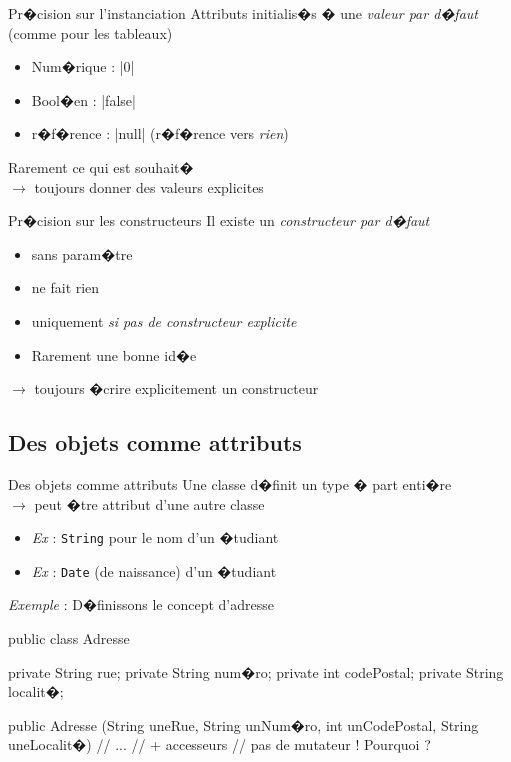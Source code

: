 \begin{frame}{Pr�cision sur l'instanciation}
Attributs initialis�s � une \emph{valeur par d�faut} \\(comme pour les tableaux)
  \begin{itemize}
  \item Num�rique : \java|0|
  \item Bool�en : \java|false|
  \item r�f�rence : \java|null| (r�f�rence vers \emph{rien})
  \end{itemize}
\bigskip
Rarement ce qui est souhait�
  \\$\longrightarrow$ toujours donner des valeurs explicites
\end{frame}

\begin{frame}{Pr�cision sur les constructeurs}
Il existe un \emph{constructeur par d�faut}
\begin{itemize}
  \item sans param�tre 
  \item ne fait rien
  \item uniquement \emph{si pas de constructeur explicite}
  \item Rarement une bonne id�e 
\end{itemize}
$\longrightarrow$ toujours �crire explicitement un constructeur
\end{frame}

\subsection{Des objets comme attributs}

\begin{frame}[fragile]{Des objets comme attributs}
Une classe d�finit un type � part enti�re 
\\$\longrightarrow$ peut �tre attribut d'une autre classe
  \begin{itemize}
  \item \emph{Ex} : \texttt{String} pour le nom d'un �tudiant
  \item \emph{Ex} : \texttt{Date} (de naissance) d'un �tudiant
  \end{itemize}
\bigskip
\pause
\emph{Exemple} : D�finissons le concept d'adresse
\begin{Java}[basicstyle=\scriptsize]
public class Adresse {
  private String rue;
  private String num�ro;
  private int codePostal;
  private String localit�;
  
  public Adresse (String uneRue, String unNum�ro, 
          int unCodePostal, String uneLocalit�) {
    // ...
  }
  // + accesseurs 
  // pas de mutateur ! Pourquoi ?
}
\end{Java}
\end{frame}

